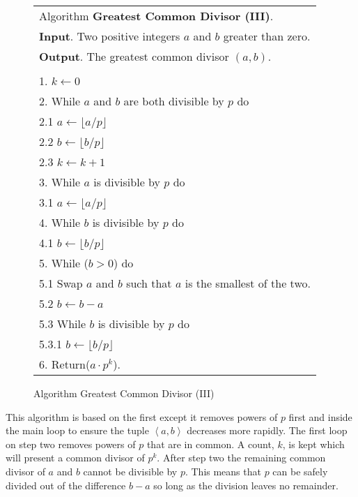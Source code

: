 \documentclass[b5paper]{book}
\begin{document}
\begin{figure}[!here]
\begin{small}
\begin{center}
\begin{tabular}{l}
\hline Algorithm \textbf{Greatest Common Divisor (III)}. \\
\textbf{Input}.   Two positive integers $a$ and $b$ greater than zero. \\
\textbf{Output}.  The greatest common divisor $(a, b)$.  \\
\hline \\
1.  $k \leftarrow 0$ \\
2.  While $a$ and $b$ are both divisible by $p$ do \\
\hspace{3mm}2.1  $a \leftarrow \lfloor a / p \rfloor$ \\
\hspace{3mm}2.2  $b \leftarrow \lfloor b / p \rfloor$ \\
\hspace{3mm}2.3  $k \leftarrow k + 1$ \\
3.  While $a$ is divisible by $p$ do \\
\hspace{3mm}3.1  $a \leftarrow \lfloor a / p \rfloor$ \\
4.  While $b$ is divisible by $p$ do \\
\hspace{3mm}4.1  $b \leftarrow \lfloor b / p \rfloor$ \\
5.  While ($b > 0$) do \\
\hspace{3mm}5.1  Swap $a$ and $b$ such that $a$ is the smallest of the two. \\
\hspace{3mm}5.2  $b \leftarrow b - a$ \\
\hspace{3mm}5.3  While $b$ is divisible by $p$ do \\
\hspace{6mm}5.3.1  $b \leftarrow \lfloor b / p \rfloor$ \\
6.  Return($a \cdot p^k$). \\
\hline
\end{tabular}
\end{center}
\end{small}
\caption{Algorithm Greatest Common Divisor (III)}
\label{fig:gcd3}
\end{figure}

This algorithm is based on the first except it removes powers of $p$ first and inside the main loop to ensure the tuple $\left < a, b \right >$ 
decreases more rapidly.  The first loop on step two removes powers of $p$ that are in common.  A count, $k$, is kept which will present a common
divisor of $p^k$.  After step two the remaining common divisor of $a$ and $b$ cannot be divisible by $p$.  This means that $p$ can be safely 
divided out of the difference $b - a$ so long as the division leaves no remainder.  
\end{document}
